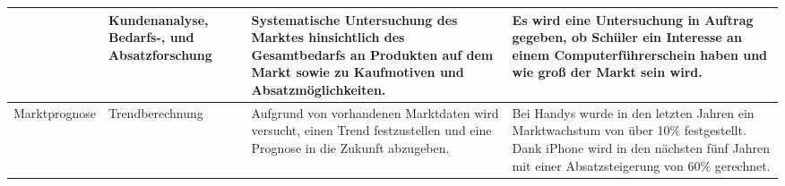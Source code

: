 \begin{tabular}{|p{}|
				 p{}|
				 p{}|
				 p{}|}
	\cline{2-4}
& Kundenanalyse, Bedarfs-, und Absatzforschung & Systematische Untersuchung des Marktes hinsichtlich des Gesamtbedarfs an Produkten auf dem Markt sowie zu Kaufmotiven und Absatzmöglichkeiten. & Es wird eine Untersuchung in Auftrag gegeben, ob Schüler ein Interesse an einem Computerführerschein haben und wie groß der Markt sein wird. \\
	\hline
Marktprognose & Trendberechnung & Aufgrund von vorhandenen Marktdaten wird versucht, einen Trend festzustellen und eine Prognose in die Zukunft abzugeben. & Bei Handys wurde in den letzten Jahren ein Marktwachstum von über 10\% festgestellt. Dank iPhone wird in den nächsten fünf Jahren mit einer Absatzsteigerung von 60\% gerechnet. \\
	\hline
\end{tabular}

